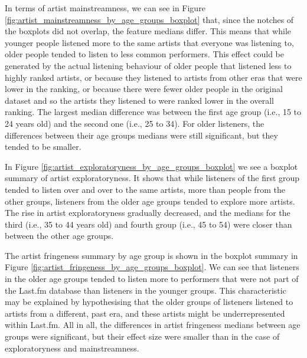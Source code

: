 In terms of artist mainstreamness, we can see in  Figure \ref{fig:artist_mainstreamness_by_age_groups_boxplot} that, since the notches of the boxplots did not overlap, the feature medians differ.
This means that while younger people listened more to the same artists that everyone was listening to, older people tended to listen to less common performers. 
This effect could be generated by the actual listening behaviour of older people that listened less to highly ranked artists, or because they listened to artists from other eras that were lower in the ranking, or because there were fewer older people in the original dataset and so the artists they listened to were ranked lower in the overall ranking. 
The largest median difference was between the first age group (i.e., 15 to 24 years old) and the second one (i.e., 25 to 34). For older listeners, the  differences between their age groups medians were still significant, but they tended to be smaller.  

In Figure \ref{fig:artist_exploratoryness_by_age_groups_boxplot} we see a boxplot summary of artist exploratoryness. It shows that while listeners of the first group tended to listen over and over to the same artists, more than people from the other groups, listeners from the older age groups tended to explore more artists. The rise in artist exploratoryness gradually decreased, and the medians for the third (i.e., 35 to 44 years old) and fourth group (i.e., 45 to 54) were closer than between the other age groups.

The artist fringeness summary by age group is shown in the boxplot summary in  Figure \ref{fig:artist_fringeness_by_age_groups_boxplot}. We can see that  listeners in the older age groups tended to listen more to performers that were not part of the Last.fm database than listeners in the younger groups. This characteristic may be explained by hypothesising that the older groups of listeners listened to artists from a different, past era, and these artists might be underrepresented within Last.fm. 
All in all, the differences in artist fringeness medians between age groups were significant, but their effect size were smaller than in the case of exploratoryness and mainstreamness.





